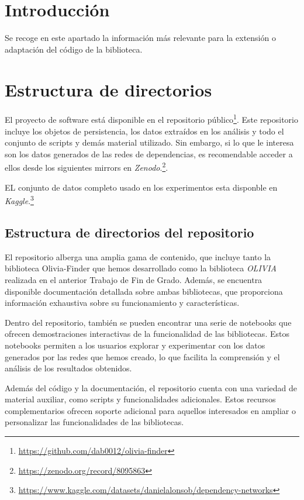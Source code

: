
\section{Introducción}
Se recoge en este apartado la información más relevante para la extensión
o adaptación del código de la biblioteca.

\section{Estructura de directorios}
El proyecto de software está disponible en el repositorio público\footnote{\url{https://github.com/dab0012/olivia-finder}}.
Este repositorio incluye los objetos de persistencia, los datos extraídos en los análisis y todo el
conjunto de scripts y demás material utilizado. Sin embargo, si lo que le interesa son los datos generados de las redes de dependencias,
es recomendable acceder a ellos desde los siguientes mirrors en \textit{Zenodo}.\footnote{\url{https://zenodo.org/record/8095863}}.

EL conjunto de datos completo usado en los experimentos esta disponble en \textit{Kaggle}.\footnote{\url{https://www.kaggle.com/datasets/danielalonsob/dependency-networks}}

\subsection{Estructura de directorios del repositorio}

El repositorio alberga una amplia gama de contenido, que incluye tanto la biblioteca Olivia-Finder que hemos
desarrollado como la biblioteca \textit{OLIVIA} realizada en el anterior Trabajo de Fin de Grado. Además, se encuentra
disponible documentación detallada sobre ambas bibliotecas, que proporciona información exhaustiva sobre su
funcionamiento y características.

Dentro del repositorio, también se pueden encontrar una serie de notebooks que ofrecen demostraciones interactivas
de la funcionalidad de las bibliotecas. Estos notebooks permiten a los usuarios explorar y experimentar con los
datos generados por las redes que hemos creado, lo que facilita la comprensión y el análisis de los resultados
obtenidos.

Además del código y la documentación, el repositorio cuenta con una variedad de material auxiliar, como scripts
y funcionalidades adicionales. Estos recursos complementarios ofrecen soporte adicional para aquellos interesados
en ampliar o personalizar las funcionalidades de las bibliotecas.

